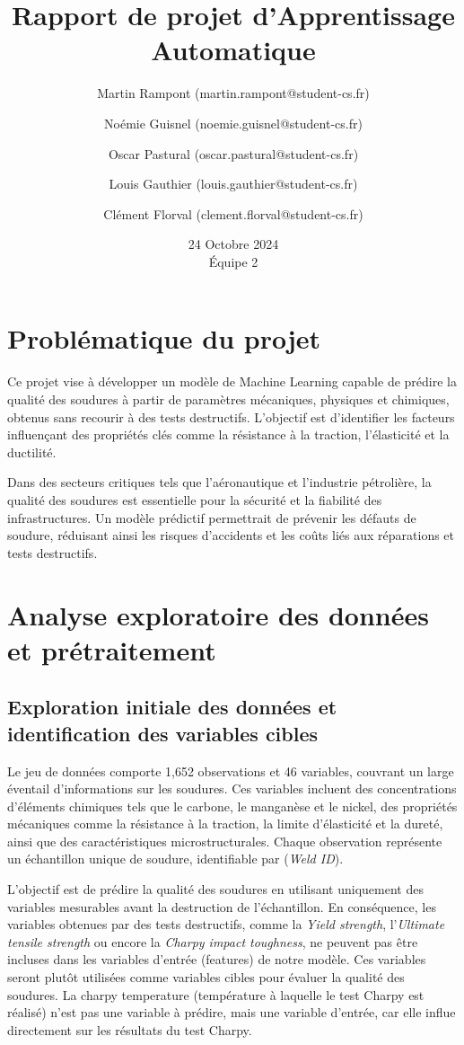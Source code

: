 \documentclass{article}
\title{Rapport de projet d'Apprentissage Automatique}
\author{
    \small Martin Rampont (martin.rampont@student-cs.fr) \and 
    \small Noémie Guisnel (noemie.guisnel@student-cs.fr) \and 
    \small Oscar Pastural (oscar.pastural@student-cs.fr) \and 
    \small Louis Gauthier (louis.gauthier@student-cs.fr) \and 
    \small Clément Florval (clement.florval@student-cs.fr)
}
\date{24 Octobre 2024 \\ Équipe 2}
\begin{document}
\maketitle
\tableofcontents
\section{Problématique du projet}

Ce projet vise à développer un modèle de Machine Learning capable de prédire la qualité des soudures à partir de paramètres mécaniques, physiques et chimiques, obtenus sans recourir à des tests destructifs. L'objectif est d'identifier les facteurs influençant des propriétés clés comme la résistance à la traction, l'élasticité et la ductilité.

Dans des secteurs critiques tels que l'aéronautique et l'industrie pétrolière, la qualité des soudures est essentielle pour la sécurité et la fiabilité des infrastructures. Un modèle prédictif permettrait de prévenir les défauts de soudure, réduisant ainsi les risques d'accidents et les coûts liés aux réparations et tests destructifs.

\section{Analyse exploratoire des données et prétraitement}

\subsection{Exploration initiale des données et identification des variables cibles}

Le jeu de données comporte 1,652 observations et 46 variables, couvrant un large éventail d'informations sur les soudures. Ces variables incluent des concentrations d'éléments chimiques tels que le carbone, le manganèse et le nickel, des propriétés mécaniques comme la résistance à la traction, la limite d’élasticité et la dureté, ainsi que des caractéristiques microstructurales. Chaque observation représente un échantillon unique de soudure, identifiable par (\textit{Weld ID}).

L’objectif est de prédire la qualité des soudures en utilisant uniquement des variables mesurables avant la destruction de l'échantillon. En conséquence, les variables obtenues par des tests destructifs, comme la \textit{Yield strength}, l'\textit{Ultimate tensile strength} ou encore la \textit{Charpy impact toughness}, ne peuvent pas être incluses dans les variables d'entrée (features) de notre modèle. Ces variables seront plutôt utilisées comme variables cibles pour évaluer la qualité des soudures. La charpy temperature (température à laquelle le test Charpy est réalisé) n'est pas une variable à prédire, mais une variable d'entrée, car elle influe directement sur les résultats du test Charpy.
\end{document}
